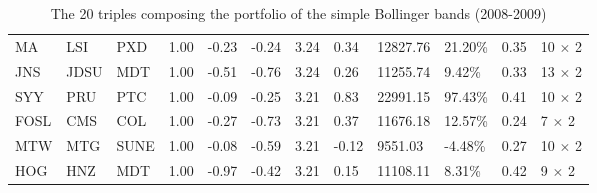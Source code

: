 \documentclass[11pt,a4,twosided,singlespacing,titlepagenumber=on]{scrreprt}
\numberwithin{equation}{chapter} %
\theoremstyle{remark}
\begin{document}
\begin{table}[H]
\begin{adjustwidth}{-2.6cm}{}
\begin{tabular}{llllllllllll}
MA  & LSI  & PXD  & 1.00 & -0.23 & -0.24 & 3.24 & 0.34 & 12827.76 & 21.20\%& 0.35 & 10 $\times$ 2\\
JNS  & JDSU  & MDT  & 1.00 & -0.51 & -0.76 & 3.24 & 0.26 & 11255.74 & 9.42\%& 0.33 & 13 $\times$ 2\\
SYY  & PRU  & PTC  & 1.00 & -0.09 & -0.25 & 3.21 & 0.83 & 22991.15 & 97.43\%& 0.41 & 10 $\times$ 2\\
FOSL  & CMS  & COL  & 1.00 & -0.27 & -0.73 & 3.21 & 0.37 & 11676.18 & 12.57\%& 0.24 & 7 $\times$ 2\\
MTW  & MTG  & SUNE  & 1.00 & -0.08 & -0.59 & 3.21 & -0.12 & 9551.03 & -4.48\%& 0.27 & 10 $\times$ 2\\
HOG  & HNZ  & MDT  & 1.00 & -0.97 & -0.42 & 3.21 & 0.15 & 11108.11 & 8.31\%& 0.42 & 9 $\times$ 2\\
\hline
\end{tabular}
\caption{The 20 triples composing the portfolio of the simple Bollinger bands (2008-2009)}
\label{20_selected_triples_simple_bands}
\end{adjustwidth}
\end{table}
\end{document}
